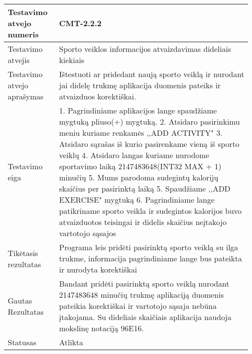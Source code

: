\documentclass[oneside]{VUMIFPSkursinis}
\begin{document}
\begin{center}
    \begin{tabular}{ |p{5cm}|p{13cm}|}
    \hline
    	Testavimo atvejo numeris & CMT-2.2.2  \\ \hline
    	Testavimo atvejis & Sporto veiklos informacijos atvaizdavimas dideliais kiekiais  \\ \hline
	Testavimo atvejo aprašymas & Ištestuoti ar pridedant naują sporto veiklą ir nurodant jai didelę trukmę aplikacija duomenis pateiks ir atvaizduos korektiškai.  \\ \hline
	Testavimo eiga & 1. Pagrindiniame aplikacijos lange spaudžiame mygtuką pliuso(+) mygtuką. 
				2. Atsidaro pasirinkimu meniu kuriame renkamės ,,ADD ACTIVITY"
				3. Atsidaro sąrašas iš kurio pasirenkame vieną iš sporto veiklų
				4. Atsidaro langas kuriame nurodome sportavimo laiką  2147483648(INT32 MAX + 1) minučių
				5. Mums parodoma sudegintų kalorijų skaičius per pasirinktą laiką
				5. Spaudžiame ,,ADD EXERCISE"  mygtuką
				6. Pagrindiniame lange patikriname sporto veikla ir sudegintos kalorijos buvo atvaizduotos teisingai ir didelis skaičius neįtakojo vartotojo sąsajos\\ \hline
	Tikėtasis rezultatas & Programa leis pridėti pasirinktą sporto veiklą su ilga trukme, informacija pagrindiniame lange bus pateikta ir nurodyta korektiškai  \\ \hline
	Gautas Rezultatas & Bandant pridėti pasirinktą sporto veiklą nurodant 2147483648 minučių trukmę aplikaciją duomenis pateikia korektiškai ir vartotojo sąsaja nebūna įtakojama. Su dideliais skaičiais aplikacija naudoja mokslinę notaciją 96E16.  \\ \hline
	Statusas & Atlikta  \\ \hline
    \hline
    \end{tabular}
\end{center}
\end{document}
